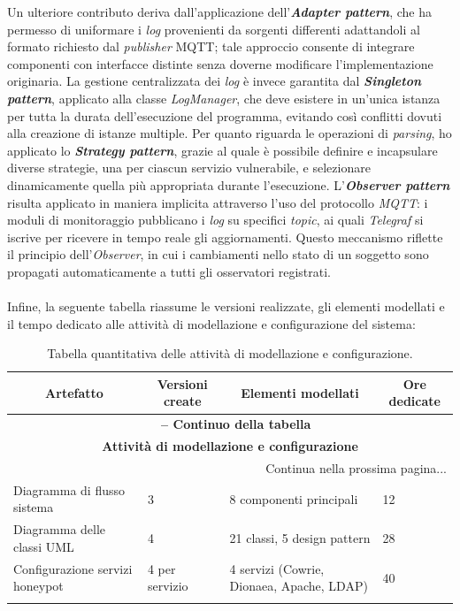 Un ulteriore contributo deriva dall'applicazione dell'\textbf{\textit{Adapter pattern}}, che ha permesso di uniformare i \textit{log} provenienti da sorgenti differenti adattandoli al formato richiesto dal \textit{publisher} MQTT; tale approccio consente di integrare componenti con interfacce distinte senza doverne modificare l'implementazione originaria. 
La gestione centralizzata dei \textit{log} è invece garantita dal \textbf{\textit{Singleton pattern}}, applicato alla classe \textit{LogManager}, che deve esistere in un'unica istanza per tutta la durata dell'esecuzione del programma, evitando così conflitti dovuti alla creazione di istanze multiple. 
Per quanto riguarda le operazioni di \textit{parsing}, ho applicato lo \textbf{\textit{Strategy pattern}}, grazie al quale è possibile definire e incapsulare diverse strategie, una per ciascun servizio vulnerabile, e selezionare dinamicamente quella più appropriata durante l'esecuzione. 
L'\textbf{\textit{Observer pattern}} risulta applicato in maniera implicita attraverso l'uso del protocollo \textit{MQTT}: i moduli di monitoraggio pubblicano i \textit{log} su specifici \textit{topic}, ai quali \textit{Telegraf} si iscrive per ricevere in tempo reale gli aggiornamenti. 
Questo meccanismo riflette il principio dell'\textit{Observer}, in cui i cambiamenti nello stato di un soggetto sono propagati automaticamente a tutti gli osservatori registrati.\\\\
Infine, la seguente tabella riassume le versioni realizzate, gli elementi modellati e il tempo dedicato alle attività di modellazione e configurazione del sistema:
\begin{center}
\begin{longtable}{|p{}|p{}|p{}|p{}|}
\hline
\multicolumn{1}{|c|}{\textbf{Artefatto}} & 
\multicolumn{1}{c|}{\textbf{Versioni create}} & 
\multicolumn{1}{c|}{\textbf{Elementi modellati}} & 
\multicolumn{1}{c|}{\textbf{Ore dedicate}} \\ 
\hline
\endfirsthead

\multicolumn{4}{c}{{\bfseries \tablename\ \thetable{} -- Continuo della tabella}}\\
\hline
\multicolumn{4}{|c|}{\textbf{Attività di modellazione e configurazione}} \\ \hline
\endhead

\hline \multicolumn{4}{|r|}{{Continua nella prossima pagina...}} \\ \hline
\endfoot

\endlastfoot

Diagramma di flusso sistema & 3 & 8 componenti principali & 12 \\ \hline
Diagramma delle classi UML & 4 & 21 classi, 5 design pattern & 28 \\ \hline
Configurazione servizi honeypot & 4 per servizio & 4 servizi (Cowrie, Dionaea, Apache, LDAP) & 40 \\ \hline

\caption{Tabella quantitativa delle attività di modellazione e configurazione.}
\label{tab:modellazione-configurazione}
\end{longtable}
\end{center}